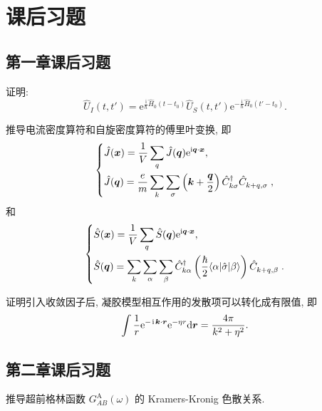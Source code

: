 \chapter{课后习题}
\section{第一章课后习题}
\begin{question2}{}{}
证明:
\begin{equation}
    \hat U_I(t, t')=\mathrm e^{\frac{\mathrm i}{\hbar}\hat H_0(t-t_0)}\hat U_S(t, t')\mathrm e^{-\frac{\mathrm i}{\hbar}\hat H_0(t'-t_0)}. 
 \end{equation}
\end{question2}

\begin{question2}{}{}
推导电流密度算符和自旋密度算符的傅里叶变换, 即
\begin{equation}
    \left\{
 \begin{aligned}
 &\hat J(\boldsymbol{x})=\frac{1}{V}\sum_{ q}\hat J(\boldsymbol{q})\mathrm e^{\mathrm i\boldsymbol{q}\cdot \boldsymbol{x}}, \\
 &\hat J(\boldsymbol{q})=\frac{e}{m}\sum_{k}\sum_{\sigma}\left( \boldsymbol{k}+\frac{\boldsymbol{q}}{2} \right)\hat C_{ k{\sigma}}^\dagger \hat{C}_{{k+q}, {\sigma}}^{}\;,
 \end{aligned}
 \right. 
 \end{equation}
和
\begin{equation}
    \left\{
 \begin{aligned}
 &\hat S(\boldsymbol{x})=\frac{1}{V}\sum_{{q}} \hat S(\boldsymbol{q})\mathrm e^{\mathrm i\boldsymbol{q}\cdot\boldsymbol{x}}, \\
 &\hat S(\boldsymbol{q})=\sum_{{k}}\sum_\alpha\sum_\beta\hat C_{ k\alpha}^\dagger\left( \frac{\hbar}{2}\langle \alpha|\hat {\sigma}|\beta \rangle \right)\hat C_{{k+q}, \beta}^{}\;. 
 \end{aligned}
 \right. 
 \end{equation}
\end{question2}

\begin{question2}{}{}
证明引入收敛因子后, 凝胶模型相互作用的发散项可以转化成有限值, 即
\begin{equation}
    \int\frac{1}{r}\mathrm{e}^{-\hspace{0.1em}\mathrm{i}\hspace{0.1em}\boldsymbol{k}\cdot\boldsymbol{r}}\mathrm{e}^{-\eta r}\mathrm{d}\boldsymbol{r}=\frac{4\pi}{k^2+\eta^2}. 
\end{equation}
\end{question2}
\section{第二章课后习题}
\begin{question2}{}{}
        推导超前格林函数 $G_{AB}^{\mathrm{A}}(\omega)$ 的 Kramers-Kronig 色散关系.
\end{question2}

